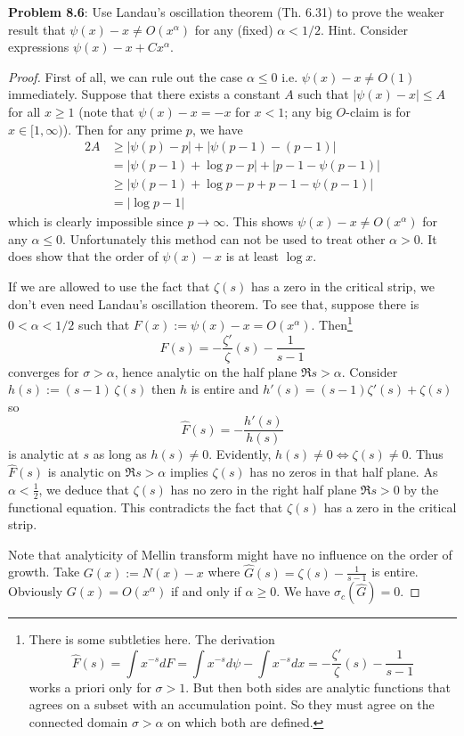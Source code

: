 \documentclass[12pt]{article}
\newcommand{\Fhat}{\widehat{F}}
\newcommand{\Ghat}{\widehat{G}}
\begin{document}
\fi

\textbf{Problem 8.6}: Use Landau's oscillation theorem (Th. 6.31) to prove the weaker result that $\psi(x) - x \not= O(x^\alpha)$ for any (fixed) $\alpha < 1/2$. Hint. Consider expressions $\psi(x) - x + Cx^\alpha$.

\begin{proof}
First of all, we can rule out the case $\alpha \leq 0$ i.e. $\psi(x) - x \not= O(1)$ immediately. Suppose that there exists a constant $A$ such that $|\psi(x) - x| \leq A$ for all $x \geq 1$ (note that $\psi(x) - x = -x$ for $x < 1$; any big $O$-claim is for $x \in [1, \infty)$). Then for any prime $p$, we have
\begin{align*}
2A &\geq |\psi(p) - p| + |\psi(p-1) - (p - 1)|\\
&= |\psi(p - 1) + \log p - p| + |p - 1 - \psi(p-1)|\\
&\geq |\psi(p - 1) + \log p - p + p - 1 - \psi(p-1)|\\
&= |\log p - 1|
\end{align*}
which is clearly impossible since $p \rightarrow \infty$. This shows $\psi(x) - x \not= O(x^\alpha)$ for any $\alpha \leq 0$. Unfortunately this method can not be used to treat other $\alpha > 0$. It does show that the order of $\psi(x) - x$ is at least $\log x$.

If we are allowed to use the fact that $\zeta(s)$ has a zero in the critical strip, we don't even need Landau's oscillation theorem. To see that, suppose there is $0 < \alpha < 1/2$ such that $F(x) := \psi(x) - x = O(x^\alpha)$. Then\footnote{There is some subtleties here. The derivation $$\Fhat(s) = \int x^{-s} dF = \int x^{-s} d\psi - \int x^{-s} dx = -\frac{\zeta'}{\zeta}(s) - \frac{1}{s - 1}$$ works a priori only for $\sigma > 1$. But then both sides are analytic functions that agrees on a subset with an accumulation point. So they must agree on the connected domain $\sigma > \alpha$ on which both are defined.}
$$\Fhat(s) = -\frac{\zeta'}{\zeta}(s) - \frac{1}{s - 1}$$
converges for $\sigma > \alpha$, hence analytic on the half plane $\Re s > \alpha$. Consider $h(s) := (s - 1) \, \zeta(s)$ then $h$ is entire and $h'(s) = (s - 1) \zeta'(s) + \zeta(s)$ so
$$\Fhat(s) = -\frac{h'(s)}{h(s)}$$
is analytic at $s$ as long as $h(s) \not= 0$. Evidently, $h(s) \not= 0 \iff \zeta(s) \not= 0$. Thus $\Fhat(s)$ is analytic on $\Re s > \alpha$ implies $\zeta(s)$ has no zeros in that half plane. As $\alpha < \frac12$, we deduce that $\zeta(s)$ has no zero in the right half plane $\Re s > 0$ by the functional equation. This contradicts the fact that $\zeta(s)$ has a zero in the critical strip.

Note that analyticity of Mellin transform might have no influence on the order of growth. Take $G(x) := N(x) - x$ where $\Ghat(s) = \zeta(s) - \frac{1}{s - 1}$ is entire. Obviously $G(x) = O(x^\alpha)$ if and only if $\alpha \geq 0$. We have $\sigma_c(\Ghat) = 0$.
\end{proof}
\end{document}
